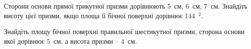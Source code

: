 \documentclass[12pt]{article}
\begin{document}
\begin{samepage}
\noindent\zadnum Сторони основи прямої трикутної призми дорівнюють 5~см, 6~см, 7~см. Знайдіть висоту цієї призми, якщо площа її бічної поверхні дорівнює 144~$^2$. 

\nmtnobreak
\nopagebreak\nbvspace{0.3cm}
\par{}
\end{samepage}

\begin{samepage}
\noindent\zadnum Знайдіть площу бічної поверхні правильної шестикутної призми, сторона основи якої дорівнює 5~см, а висота призми – 4~см. 

\nmtnobreak
\nopagebreak\nbvspace{0.3cm}
\par{}
\end{samepage}
\end{document}
